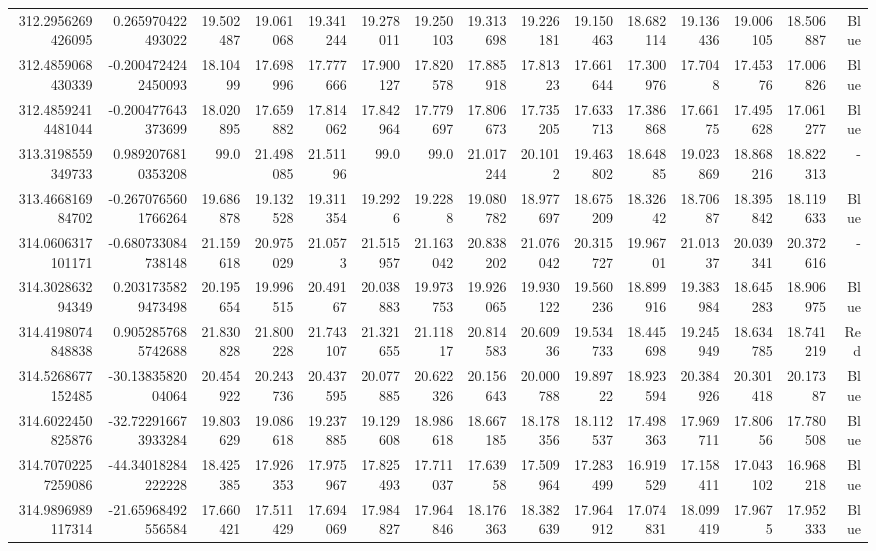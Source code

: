 \begin{center}
\begin{longtable}{rrrrrrrrrrrrrrr}
312.2956269426095 & 0.265970422493022 & 19.502487 & 19.061068 & 19.341244 & 19.278011 & 19.250103 & 19.313698 & 19.226181 & 19.150463 & 18.682114 & 19.136436 & 19.006105 & 18.506887 & Blue \\
312.4859068430339 & -0.2004724242450093 & 18.10499 & 17.698996 & 17.777666 & 17.900127 & 17.820578 & 17.885918 & 17.81323 & 17.661644 & 17.300976 & 17.7048 & 17.45376 & 17.006826 & Blue \\
312.48592414481044 & -0.200477643373699 & 18.020895 & 17.659882 & 17.814062 & 17.842964 & 17.779697 & 17.806673 & 17.735205 & 17.633713 & 17.386868 & 17.66175 & 17.495628 & 17.061277 & Blue \\
313.3198559349733 & 0.9892076810353208 & 99.0 & 21.498085 & 21.51196 & 99.0 & 99.0 & 21.017244 & 20.1012 & 19.463802 & 18.64885 & 19.023869 & 18.868216 & 18.822313 & - \\
313.466816984702 & -0.2670765601766264 & 19.686878 & 19.132528 & 19.311354 & 19.2926 & 19.2288 & 19.080782 & 18.977697 & 18.675209 & 18.32642 & 18.70687 & 18.395842 & 18.119633 & Blue \\
314.0606317101171 & -0.680733084738148 & 21.159618 & 20.975029 & 21.0573 & 21.515957 & 21.163042 & 20.838202 & 21.076042 & 20.315727 & 19.96701 & 21.01337 & 20.039341 & 20.372616 & - \\
314.302863294349 & 0.2031735829473498 & 20.195654 & 19.996515 & 20.49167 & 20.038883 & 19.973753 & 19.926065 & 19.930122 & 19.560236 & 18.899916 & 19.383984 & 18.645283 & 18.906975 & Blue \\
314.4198074848838 & 0.9052857685742688 & 21.830828 & 21.800228 & 21.743107 & 21.321655 & 21.11817 & 20.814583 & 20.60936 & 19.534733 & 18.445698 & 19.245949 & 18.634785 & 18.741219 & Red \\
314.5268677152485 & -30.1383582004064 & 20.454922 & 20.243736 & 20.437595 & 20.077885 & 20.622326 & 20.156643 & 20.000788 & 19.89722 & 18.923594 & 20.384926 & 20.301418 & 20.17387 & Blue \\
314.6022450825876 & -32.722916673933284 & 19.803629 & 19.086618 & 19.237885 & 19.129608 & 18.986618 & 18.667185 & 18.178356 & 18.112537 & 17.498363 & 17.969711 & 17.80656 & 17.780508 & Blue \\
314.70702257259086 & -44.34018284222228 & 18.425385 & 17.926353 & 17.975967 & 17.825493 & 17.711037 & 17.63958 & 17.509964 & 17.283499 & 16.919529 & 17.158411 & 17.043102 & 16.968218 & Blue \\
314.9896989117314 & -21.65968492556584 & 17.660421 & 17.511429 & 17.694069 & 17.984827 & 17.964846 & 18.176363 & 18.382639 & 17.964912 & 17.074831 & 18.099419 & 17.9675 & 17.952333 & Blue \\

\end{longtable}
\end{center}
